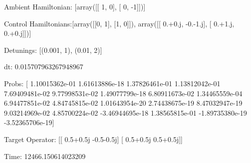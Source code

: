 \documentclass{article}
\begin{document}
    

\newpage

Ambient Hamiltonian: [array([[ 1,  0],
       [ 0, -1]])]

Control Hamiltonians:[array([[0, 1],
       [1, 0]]), array([[ 0.+0.j, -0.-1.j],
       [ 0.+1.j,  0.+0.j]])]

Detunings: [(0.001, 1), (0.01, 2)]

 dt: 0.015707963267948967

Probs: [  1.10015362e-01   1.61613886e-18   1.37826461e-01   1.13812042e-01
   7.69409481e-02   9.77998531e-02   1.49077799e-18   6.80911673e-02
   1.34465559e-04   6.94477851e-02   4.84745815e-02   1.01643954e-20
   2.74438675e-19   8.47032947e-19   9.03214969e-02   4.85700224e-02
  -3.46944695e-18   1.38565815e-01  -1.89735380e-19  -3.52365706e-19]

Target Operator: [[ 0.5+0.5j -0.5-0.5j]
 [ 0.5+0.5j  0.5+0.5j]]

Time: 12466.150614023209
\end{document}
